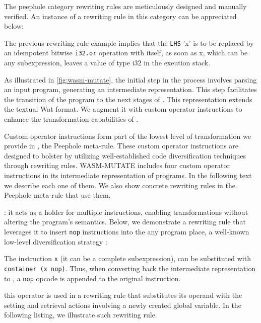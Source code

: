 The peephole category rewriting rules are meticulously designed and manually verified. 
An instance of a rewriting rule in this category can be appreciated below:



The previous rewriting rule example implies that the \texttt{LHS} 'x' is to be replaced by an idempotent bitwise \texttt{i32.or} operation with itself,  as soon as x, which can be any subexpression, leaves a value of type i32 in the exeution stack.

\label{custom}

As illustrated in \autoref{fig:wasm-mutate}, the initial step in the process involves parsing an input \Wasm program, generating an intermediate representation. 
This step facilitates the transition of the \Wasm program to the next stages of \tool. 
This representation extends the textual Wat format.
We augment it with custom operator instructions to enhance the transformation capabilities of \tool.


Custom operator instructions form part of the lowest level of transformation we provide in \tool, the Peephole meta-rule.
These custom operator instructions are designed to bolster \tool by utilizing well-established code diversification techniques through rewriting rules.
WASM-MUTATE includes four custom operator instructions in its intermediate representation of \wasm programs.
In the following text we describe each one of them.
We also show concrete rewriting rules in the Peephole meta-rule that use them.

: it acts as a holder for multiple instructions, enabling transformations without altering the program's semantics. 
Below, we demonstrate a rewriting rule that leverages it to insert \texttt{nop} instructions into the any \Wasm program place, a well-known low-level diversification strategy \cite{nop}:



\noindent The instruction \texttt{x} (it can be a complete subexpression), can be substituted with \texttt{container (x nop)}. Thus, when converting back the intermediate representation to \wasm, a \texttt{nop} opcode is appended to the original instruction.


 this operator is used in a rewriting rule that substitutes its operand with the setting and retrieval actions involving a newly created global variable. In the following listing, we illustrate such rewriting rule.

